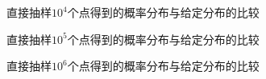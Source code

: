 \documentclass[a4paper,11pt]{article}
\begin{document}
\begin{figure}[!htbp]        
\caption{\label{1} 直接抽样$10^{4}$个点得到的概率分布与给定分布的比较}      
\end{figure}

\begin{figure}[!htbp]        
\caption{\label{1} 直接抽样$10^{5}$个点得到的概率分布与给定分布的比较}      
\end{figure}

\begin{figure}[!htbp]        
\caption{\label{1} 直接抽样$10^{6}$个点得到的概率分布与给定分布的比较}      
\end{figure}
\end{document}
